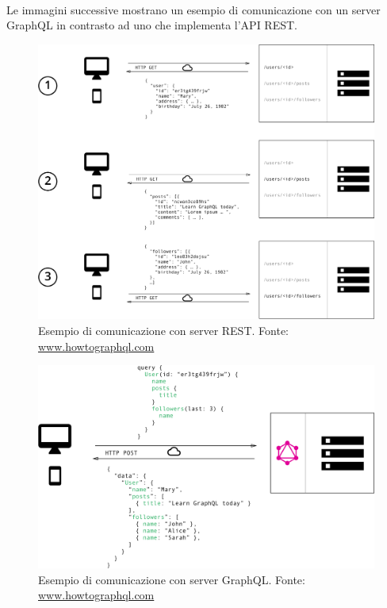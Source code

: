 \documentclass[a4paper, 12pt]{report}
\begin{document}
      \paragraph*{}Le immagini successive mostrano un esempio di comunicazione con un server GraphQL in contrasto ad uno che implementa l'API REST.
      \begin{figure}[H]
        \includegraphics[width=\textwidth]{rest-communication.png}
        \caption{Esempio di comunicazione con server REST. Fonte: \href{https://www.howtoGraphQL.com/basics/1-GraphQL-is-the-better-rest/}{www.howtographql.com}}
      \end{figure}
      \begin{figure}[H]
        \includegraphics[width=\textwidth]{graphql-communication.png}
        \caption{Esempio di comunicazione con server GraphQL. Fonte: \href{https://www.howtoGraphQL.com/basics/1-GraphQL-is-the-better-rest/}{www.howtographql.com}}
      \end{figure}
\end{document}
